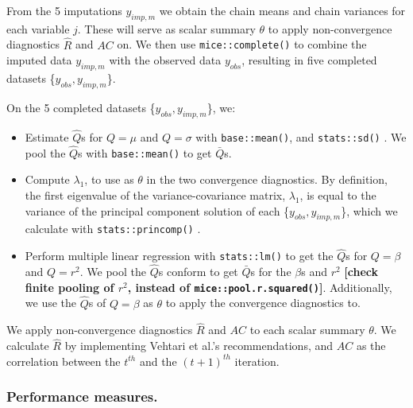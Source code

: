 \documentclass[Royal,times,sageh]{sagej}
\begin{document}
From the 5 imputations \(y_{imp,m}\) we obtain the chain means and chain variances for each variable \(j\). These will serve as scalar summary \(\theta\) to apply non-convergence diagnostics \(\widehat{R}\) and \(AC\) on. We then use \texttt{mice::complete()} to combine the imputed data \(y_{imp,m}\) with the observed data \(y_{obs}\), resulting in five completed datasets \{\(y_{obs}, y_{imp, m}\)\}.

On the 5 completed datasets \{\(y_{obs}, y_{imp, m}\)\}, we:

\begin{itemize}
\item
  Estimate \(\hat{Q}\)s for \(Q= \mu\) and \(Q=\sigma\) with \texttt{base::mean()}, and \texttt{stats::sd()} \citep{R}. We pool the \(\hat{Q}\)s with \texttt{base::mean()} to get \(\bar{Q}\)s.
\item
  Compute \(\lambda_1\), to use as \(\theta\) in the two convergence diagnostics. By definition, the first eigenvalue of the variance-covariance matrix, \(\lambda_1\), is equal to the variance of the principal component solution of each \{\(y_{obs}, y_{imp, m}\)\}, which we calculate with \texttt{stats::princomp()} \citep{R}.
\item
  Perform multiple linear regression with \texttt{stats::lm()} \citep{R} to get the \(\hat{Q}\)s for \(Q=\beta\) and \(Q=r^2\). We pool the \(\hat{Q}\)s conform \citet{vink14} to get \(\bar{Q}\)s for the \(\beta\)s and \(r^2\) \textbf{{[}check finite pooling of \(r^2\), instead of \texttt{mice::pool.r.squared()}{]}}. Additionally, we use the \(\hat{Q}\)s of \(Q=\beta\) as \(\theta\) to apply the convergence diagnostics to.
\end{itemize}

We apply non-convergence diagnostics \(\widehat{R}\) and \(AC\) to each scalar summary \(\theta\). We calculate \(\widehat{R}\) by implementing Vehtari et al.'s \citeyearpar{veht19} recommendations, and \(AC\) as the correlation between the \(t^{th}\) and the \((t+1)^{th}\) iteration.

\hypertarget{performance-measures.}{%
\subsubsection{Performance measures.}\label{performance-measures.}}
\end{document}
